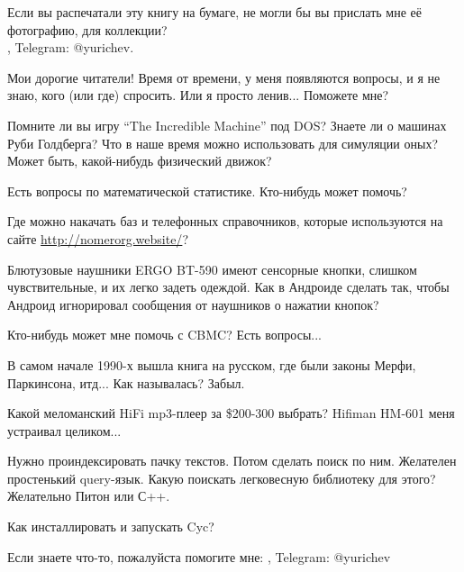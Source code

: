 \myhrule{}

Если вы распечатали эту книгу на бумаге, не могли бы вы прислать мне её фотографию, для коллекции?\\
\EMAIL{}, Telegram: @yurichev.

\myhrule{}

Мои дорогие читатели! Время от времени, у меня появляются вопросы, и я не знаю, кого (или где) спросить.
Или я просто ленив...
Поможете мне?

\myhrule{}

Помните ли вы игру ``The Incredible Machine'' под DOS?
Знаете ли о машинах Руби Голдберга?
Что в наше время можно использовать для симуляции оных?
Может быть, какой-нибудь физический движок?

\myhrule{}

Есть вопросы по математической статистике. Кто-нибудь может помочь?

\myhrule{}

Где можно накачать баз и телефонных справочников, которые используются на сайте \url{http://nomerorg.website/}?

\myhrule{}

Блютузовые наушники ERGO BT-590 имеют сенсорные кнопки, слишком чувствительные, и их легко задеть одеждой.
Как в Андроиде сделать так, чтобы Андроид игнорировал сообщения от наушников о нажатии кнопок?

\myhrule{}

Кто-нибудь может мне помочь с CBMC? Есть вопросы...

\myhrule{}

В самом начале 1990-х вышла книга на русском, где были законы Мерфи, Паркинсона, итд...
Как называлась?
Забыл.

\myhrule{}

Какой меломанский HiFi mp3-плеер за \$200-300 выбрать?
Hifiman HM-601 меня устраивал целиком...

\myhrule{}

Нужно проиндексировать пачку текстов. Потом сделать поиск по ним. Желателен простенький query-язык.
Какую поискать легковесную библиотеку для этого?
Желательно Питон или С++.

\myhrule{}

Как инсталлировать и запускать Cyc?

\myhrule{}

Если знаете что-то, пожалуйста помогите мне: \EMAIL{}, Telegram: @yurichev

